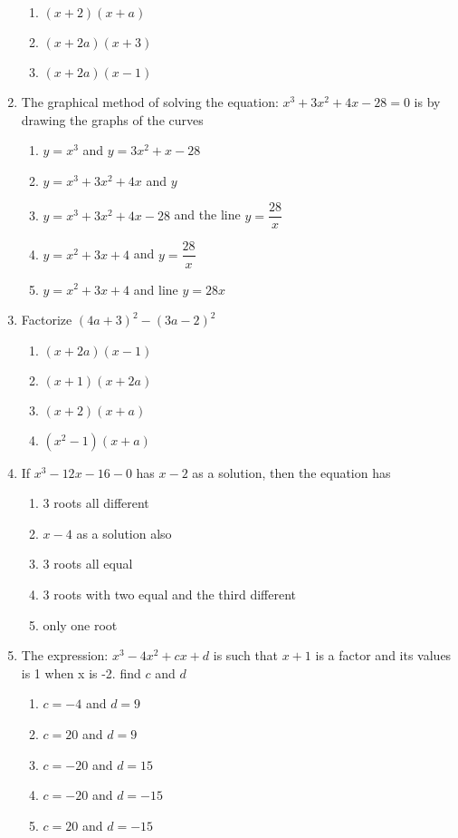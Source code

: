 \begin{multicols}{2}
\begin{enumerate}[label={\arabic*.}]
\begin{enumerate}[label={\Alph*.}]
	\item \((x+2)(x+a)\)
	\item \((x+2a)(x+3)\)
	\item \((x+2a)(x-1)\)
	\end{enumerate}
\item The graphical method of solving the equation: \(x^3+3x^2+4x-28 = 0\) is by drawing the graphs of the curves
	\begin{enumerate}[label={\Alph*.}]
	\item \(y = x^3\) and \(y=3x^2 + x -28\)
	\item \(y=x^3+3x^2+4x\) and \(y\)
	\item \(y=x^3+3x^2+4x-28\) and the line \(y=\dfrac{28}{x}\)
	\item \(y=x^2+3x+4\) and \(y=\dfrac{28}{x}\)
	\item \(y=x^2+3x+4\) and line \(y=28x\)
	\end{enumerate}
\item Factorize \((4a+3)^2-(3a-2)^2\)
	\begin{enumerate}[label={\Alph*.}]
	\item \((x+2a)(x-1)\)
	\item \((x+1)(x+2a)\)
	\item \((x+2)(x+a)\)
	\item \((x^2-1)(x+a)\)
	\end{enumerate}
\item If \(x^3 - 12x - 16 - 0\) has \(x-2\) as a solution, then the equation has
	\begin{enumerate}[label={\Alph*.}]
	\item 3 roots all different
	\item \(x-4\) as a solution also
	\item 3 roots all equal
	\item 3 roots with two equal and the third different
	\item only one root
	\end{enumerate}
\item The expression: \(x^3-4x^2+cx+d\) is such that \(x+1\) is a factor and its values is 1 when x is -2. find \(c\) and \(d\)
	\begin{enumerate}[label={\Alph*.}]
	\item \(c=-4\) and \(d=9\)
	\item \(c=20\) and \(d =9\)
	\item \(c=-20\) and \(d=15\)
	\item \(c=-20\) and \(d=-15\)
	\item \(c=20\) and \(d=-15\)

\end{enumerate}
\end{enumerate}
\end{multicols}

